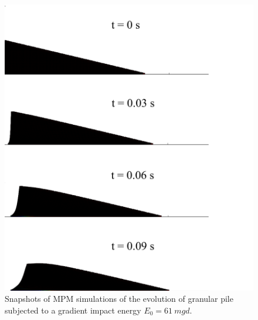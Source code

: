 \begin{figure}[tbph]
\centering
\includegraphics[width=\textwidth]{Uniform_Slope_Profile_200J}
\caption{Snapshots of MPM simulations of the evolution of granular pile 
subjected to a gradient impact energy $E_0 = 61 \ mgd$.}
\label{fig:Uniform_Slope_Profile_200J}
\end{figure}

